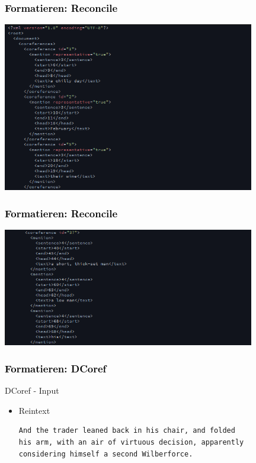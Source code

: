 \documentclass[xcolor=dvipsnames]{beamer}
\begin{document}
\begin{frame}\frametitle{\textcolor{black}{Formatieren: Reconcile}}

  \begin{center}
    \includegraphics[width=11cm]{img/xml-format-1.png}
  \end{center}
  
\end{frame}

\begin{frame}\frametitle{\textcolor{black}{Formatieren: Reconcile}}

  \begin{center}
    \includegraphics[width=11cm]{img/xml-format-2.png}
  \end{center}

\end{frame}


\begin{frame}[fragile]\frametitle{\textcolor{black}{Formatieren: DCoref}}

\begin{block}{DCoref - Input}
\begin{itemize}
\item Reintext
\begin{verbatim}
And the trader leaned back in his chair, and folded  
his arm, with an air of virtuous decision, apparently
considering himself a second Wilberforce. 
\end{verbatim}
\end{itemize}
\end{block}



\end{frame}
\end{document}
